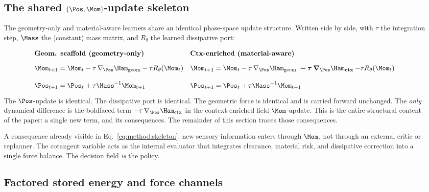 \subsection{The shared $(\Pos,\Mom)$-update skeleton}
\label{sec:method:skeleton}

The geometry-only and material-aware learners share an identical
phase-space update structure. Written side by side, with $\tau$ the
integration step, $\Mass$ the (constant) mass matrix, and $R_\theta$
the learned dissipative port:
\begin{equation}
\renewcommand{\arraystretch}{1.6}
\begin{array}{ll}
\textbf{Geom. scaffold (geometry-only)} & \textbf{Ctx-enriched (material-aware)} \\[2pt]
\Mom_{t+1} = \Mom_t
  - \tau\,\nabla_\Pos \Ham_{\mathrm{geom}}
  - \tau R_\theta(\Mom_t)
&
\Mom_{t+1} = \Mom_t
  - \tau\,\nabla_\Pos \Ham_{\mathrm{geom}}
  \;\boldsymbol{-\,\tau\,\nabla_\Pos \Ham_{\mathrm{ctx}}}
  - \tau R_\theta(\Mom_t) \\[6pt]
\Pos_{t+1} = \Pos_t + \tau \Mass^{-1} \Mom_{t+1}
&
\Pos_{t+1} = \Pos_t + \tau \Mass^{-1} \Mom_{t+1}
\end{array}
\label{eq:method:skeleton}
\end{equation}
The $\Pos$-update is identical. The dissipative port is identical. The
geometric force is identical and is carried forward unchanged. The
\emph{only} dynamical difference is the boldfaced term
$-\tau\,\nabla_\Pos \Ham_{\mathrm{ctx}}$ in the context-enriched field $\Mom$-update.
This is the entire structural content of the paper: a single new term,
and its consequences. The remainder of this section traces those
consequences.

A consequence already visible in Eq.~\eqref{eq:method:skeleton}: new
sensory information enters through $\Mom$, not through an external
critic or replanner. The cotangent variable acts as the internal
evaluator that integrates clearance, material risk, and dissipative
correction into a single force balance. The decision field \emph{is}
the policy.

\subsection{Factored stored energy and force channels}
\label{sec:method:energy}

